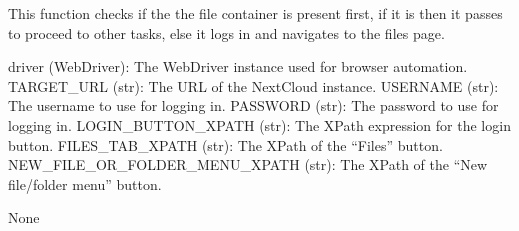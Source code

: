 \documentclass[letterpaper,10pt,english]{sphinxmanual}
\begin{document}

\begin{fulllineitems}
\label{\detokenize{utils:utils.file_management.ensure_logged_in_and_goto_files}}
\pysigstartsignatures
{}
\pysigstopsignatures
\sphinxAtStartPar
This function checks if the the file container is present first, if it is then it passes to proceed to other tasks, else it logs in and navigates to the files page.
\begin{description}
\sphinxAtStartPar
driver (WebDriver): The WebDriver instance used for browser automation.
TARGET\_URL (str): The URL of the NextCloud instance.
USERNAME (str): The username to use for logging in.
PASSWORD (str): The password to use for logging in.
LOGIN\_BUTTON\_XPATH (str): The XPath expression for the login button.
FILES\_TAB\_XPATH (str): The XPath of the “Files” button.
NEW\_FILE\_OR\_FOLDER\_MENU\_XPATH (str): The XPath of the “New file/folder menu” button.

\sphinxAtStartPar
None

\end{description}

\end{fulllineitems}

\end{document}
